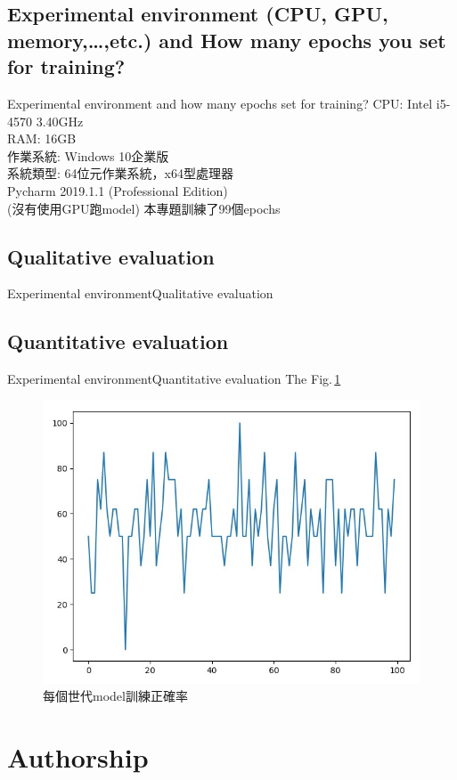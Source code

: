 \documentclass{beamer}
\begin{document}
\begin{CJK}{UTF8}{nkai}
\subsection{Experimental environment (CPU, GPU, memory,…,etc.) and How many epochs you set for training? }
\begin{frame}{Experimental environment and how many epochs set for training?}
	CPU: Intel i5-4570 3.40GHz\\
	RAM: 16GB\\
	作業系統: Windows 10企業版\\
	系統類型: 64位元作業系統，x64型處理器\\
	Pycharm 2019.1.1 (Professional Edition)\\
	(沒有使用GPU跑model)\newline\newline
	本專題訓練了99個epochs
\end{frame}

\subsection{Qualitative evaluation}
\begin{frame}{Experimental environment}{Qualitative evaluation}
	
\end{frame}
\subsection{Quantitative evaluation}

\section*{Authorship}

\end{CJK}
\end{document}
